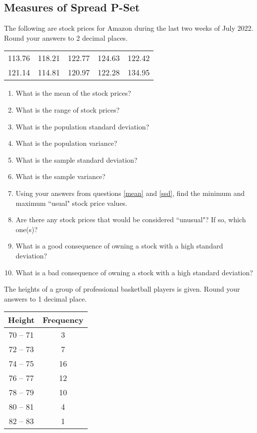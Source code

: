 \documentclass{article}
\newcounter{pset}
\begin{document}
\subsection*{Measures of Spread P-Set}

The following are stock prices for Amazon during the last two weeks of July 2022. Round your answers to 2 decimal places.

\begin{center}
\begin{tabular}{ccccc}
    113.76 & 118.21 & 122.77 & 124.63 & 122.42 \\
    121.14 & 114.81 & 120.97 & 122.28 & 134.95 \\
\end{tabular}
\end{center}

\begin{enumerate}
    \item What is the mean of the stock prices? \label{mean}
    \item What is the range of stock prices?
    \item What is the population standard deviation?
    \item What is the population variance?
    \item What is the sample standard deviation? \label{ssd}
    \item What is the sample variance?
    \item Using your answers from questions \ref{mean} and \ref{ssd}, find the minimum and maximum ``usual" stock price values.
    \item Are there any stock prices that would be considered ``unusual"? If so, which one(s)?
    \item What is a good consequence of owning a stock with a high standard deviation?
    \item What is a bad consequence of owning a stock with a high standard deviation?
\end{enumerate}     \setcounter{pset}{\value{enumi}}

The heights of a group of professional basketball players is given. Round your answers to 1 decimal place.

\begin{center}
\begin{tabular}{c|c}
    \textbf{Height} & \textbf{Frequency} \\ \hline 
    70 -- 71 & 3 \\
    72 -- 73 & 7 \\
    74 -- 75 & 16 \\
    76 -- 77 & 12 \\
    78 -- 79 & 10 \\
    80 -- 81 & 4 \\
    82 -- 83 & 1 \\
\end{tabular}
\end{center}
\end{document}
